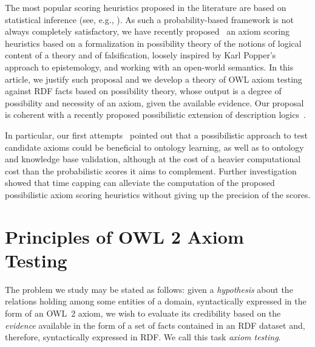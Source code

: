 \documentclass[review]{elsarticle}
\theoremstyle{definition}
\begin{document}

The most popular scoring heuristics proposed in the literature are based
on statistical inference (see, e.g., \cite{BuehmannLehmann2012}).
As such a probability-based framework is not always completely satisfactory,
we have recently proposed~\cite{TettamanziFaronZuckerGandon2014ekaw,%
TettamanziFaronZuckerGandon2015kcap}
an axiom scoring heuristics based on a formalization in possibility theory of
the notions of logical content of a theory and of falsification, loosely inspired
by Karl Popper's approach to epistemology, and working with an open-world semantics.
In this article, we justify such proposal and we develop a theory of OWL axiom
testing against RDF facts based on possibility theory, whose output is
a degree of possibility and necessity of an axiom, given the available evidence.
Our proposal is coherent with a recently proposed possibilistic extension of
description logics~\cite{QiPanJi2011,QiJiPanDu2010}.

In particular, our first attempts~\cite{TettamanziFaronZuckerGandon2014ekaw}
pointed out that a possibilistic approach to test candidate axioms
could be beneficial to ontology learning, as well as to ontology and
knowledge base validation, although at the cost of a heavier computational
cost than the probabilistic scores it aims to complement.
Further investigation~\cite{TettamanziFaronZuckerGandon2015kcap} showed that
time capping can alleviate the computation of the proposed possibilistic
axiom scoring heuristics without giving up the precision of the scores.

\section{Principles of OWL 2 Axiom Testing}\label{principles}

The problem we study may be stated as follows:
given a \emph{hypothesis} about the relations holding among some entities of a domain,
syntactically expressed in the form of an OWL~2 axiom,
we wish to evaluate its credibility based on the \emph{evidence} available
in the form of a set of facts contained in an RDF dataset and, therefore,
syntactically expressed in RDF. We call this task \emph{axiom testing}.
\end{document}
